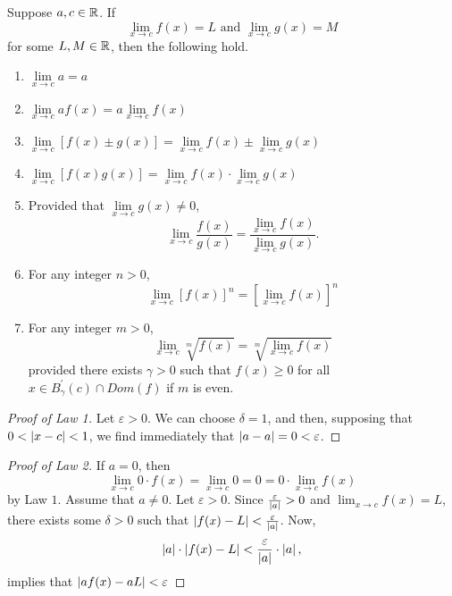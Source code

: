 \begin{thm}
     Suppose $a,c \in \mathbb{R}$. If 
     \begin{equation*}
         \lim\limits_{x \to c} f(x)=L \text{ and } \lim\limits_{x \to c} g(x)=M
     \end{equation*}
     for some $L,M \in \mathbb{R}$, then the following hold.
     \begin{enumerate}
         \item $\lim\limits_{x \to c} a=a$
         \item $\lim\limits_{x \to c} af(x)=a\lim\limits_{x \to c}f(x)$
         \item $\lim\limits_{x \to c} [f(x)\pm g(x)] = \lim\limits_{x \to c}
         f(x) \pm \lim\limits_{x \to c} g(x)$
         \item $\lim\limits_{x \to c} [f(x)g(x)] = \lim\limits_{x \to c} f(x)
         \cdot \lim\limits_{x \to c} g(x)$
         \item Provided that $\lim\limits_{x \to c} g(x) \neq 0$,
         \begin{equation*}
            \lim\limits_{x \to c} \dfrac{f(x)}{g(x)} = \dfrac{\lim\limits_{x \to c} f(x)}{\lim\limits_{x \to c} g(x)}.
         \end{equation*}
         \item For any integer $n>0$, 
            \begin{equation*}
                \lim\limits_{x \to c} [f(x)]^n = [\lim\limits_{x \to c} f(x)]^n
            \end{equation*}
        \item For any integer $m>0$, 
            \begin{equation*}
                \lim\limits_{x \to c} \sqrt[m]{f(x)} = \sqrt[m]{\lim\limits_{x \to c} f(x)}
            \end{equation*}
            provided there exists $\gamma>0$ such that $f(x)\geq 0$ for all $x
            \in B_{\gamma}^{'}(c) \cap Dom(f)$ if $m$ is even.
     \end{enumerate}
     \begin{proof}[Proof of Law 1]
        Let $\varepsilon > 0$. We can choose $ \delta = 1$, and then, supposing
    that $0 < \left\lvert x-c\right\rvert < 1$, we find immediately that $\left\lvert a-a\right\rvert = 0 < \varepsilon$.
     \end{proof}
     \begin{proof}[Proof of Law 2]
          If $a=0$, then    
          \begin{equation*}
              \lim\limits_{x \to c} 0 \cdot f(x) = \lim\limits_{x \to c} 0 =0=0 \cdot \lim\limits_{x \to c} f(x)
          \end{equation*}
          by Law $1$. Assume that $a \neq 0$. Let $\varepsilon>0$. Since
          $\tfrac{\varepsilon}{\left\lvert a\right\rvert}>0$ and $\lim_{x \to c}f(x)=L$, there
          exists  some $\delta >0$ such that
          $\left\lvert f(x)-L\right\rvert<\tfrac{\varepsilon}{\left\lvert a\right\rvert}$. Now, 
          \begin{equation*}
              \left\lvert a\right\rvert\cdot \left\lvert f(x)-L\right\rvert< \dfrac{\varepsilon}{\left\lvert a\right\rvert} \cdot \left\lvert a\right\rvert,
          \end{equation*}
          implies that $\left\lvert af(x)-aL\right\rvert<\varepsilon$
     \end{proof}
\end{thm}